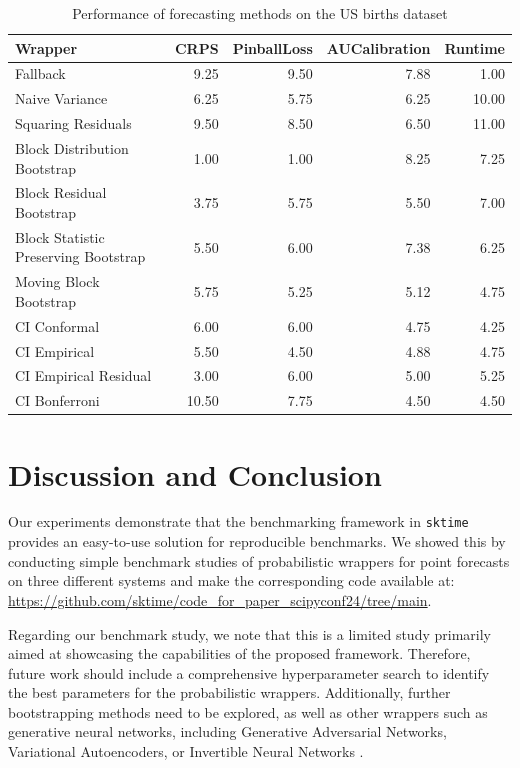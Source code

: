 \begin{table}[h]
    \centering
    \caption{Performance of forecasting methods on the US births dataset}
    \label{table:us_births_results}
\begin{tabular}{lrrrr}
\toprule
Wrapper & CRPS & PinballLoss & AUCalibration & Runtime \\
\midrule
Fallback & 9.25 & 9.50 & 7.88 & 1.00 \\
Naive Variance & 6.25 & 5.75 & 6.25 & 10.00 \\
Squaring Residuals & 9.50 & 8.50 & 6.50 & 11.00 \\
Block Distribution Bootstrap & 1.00 & 1.00 & 8.25 & 7.25 \\
Block Residual Bootstrap & 3.75 & 5.75 & 5.50 & 7.00 \\
Block Statistic Preserving Bootstrap & 5.50 & 6.00 & 7.38 & 6.25 \\
Moving Block Bootstrap & 5.75 & 5.25 & 5.12 & 4.75 \\
CI Conformal & 6.00 & 6.00 & 4.75 & 4.25 \\
CI Empirical & 5.50 & 4.50 & 4.88 & 4.75 \\
CI Empirical Residual & 3.00 & 6.00 & 5.00 & 5.25 \\
CI Bonferroni  & 10.50 & 7.75 & 4.50 & 4.50 \\
\bottomrule
\end{tabular}

\end{table}


\section{Discussion and Conclusion} \label{conclusion}
Our experiments demonstrate that the benchmarking framework in \texttt{sktime} provides an easy-to-use solution for reproducible benchmarks. We showed this by conducting simple benchmark studies of probabilistic wrappers for point forecasts on three different systems and make the corresponding code available at: \url{https://github.com/sktime/code_for_paper_scipyconf24/tree/main}.

Regarding our benchmark study, we note that this is a limited study primarily aimed at showcasing the capabilities of the proposed framework. Therefore, future work should include a comprehensive hyperparameter search to identify the best parameters for the probabilistic wrappers. Additionally, further bootstrapping methods need to be explored, as well as other wrappers such as generative neural networks, including Generative Adversarial Networks, Variational Autoencoders, or Invertible Neural Networks \citep{phipps2024, wang2020}.

